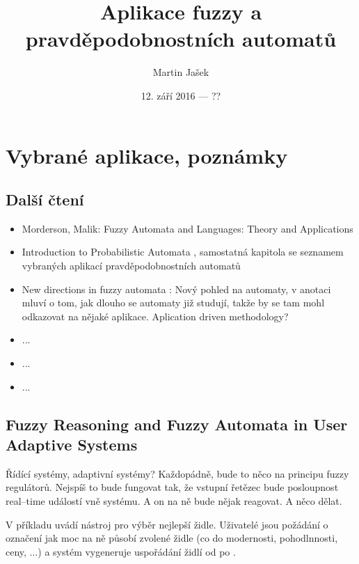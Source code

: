 \documentclass[a4paper,10pt]{article}
\title{Aplikace fuzzy a pravděpodobnostních automatů}
\author{Martin Jašek}
\date{12. září 2016 --- ??}
\begin{document}
\maketitle
\tableofcontents

\newpage

\section{Vybrané aplikace, poznámky}

\subsection{Další čtení}
\begin{itemize}
 \item Morderson, Malik: Fuzzy Automata and Languages: Theory and Applications \cite{MorMal-FuzzAutAndLangs}
 \item Introduction to Probabilistic Automata \cite{Paz-IntroProbAut}, samostatná kapitola se seznamem vybraných aplikací pravděpodobnostních automatů
 \item New directions in fuzzy automata \cite{DooKre-NewDirFuzzAut}: Nový pohled na automaty, v anotaci mluví o tom, jak dlouho se automaty již studují, takže by se tam mohl odkazovat na nějaké aplikace. Aplication driven methodology?
 \item ...
 \item ...
 \item ...
 
\end{itemize}


\subsection{Fuzzy Reasoning and Fuzzy Automata in User Adaptive Systems \cite{Kov-ReasFuzzAutInUsrAdpSyss}}

Řídící systémy, adaptivní systémy? Každopádně, bude to něco na principu fuzzy regulátorů. Nejspíš to bude fungovat tak, že vstupní řetězec bude posloupnost real--time událostí vně systému. A on na ně bude nějak reagovat. A něco dělat.

\begin{definition}
\end{definition}

V příkladu uvádí nástroj pro výběr nejlepší židle. Uživatelé jsou požádání o označení jak moc na ně působí zvolené židle (co do modernosti, pohodlnnosti, ceny, ...) a systém vygeneruje uspořádání židlí od  po .
\end{document}
